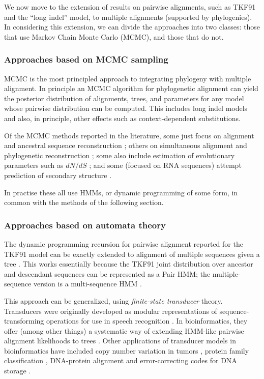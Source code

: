 \documentclass{bmcart}
\begin{document}
We now move to the extension of results on pairwise alignments,
such as TKF91 and the ``long indel'' model, to multiple alignments (supported by phylogenies).
In considering this extension,
we can divide the approaches into two classes:
those that use Markov Chain Monte Carlo (MCMC), and those that do not.

\subsubsection*{Approaches based on MCMC sampling}

MCMC is the most principled approach to integrating phylogeny with multiple alignment.
In principle an MCMC algorithm for phylogenetic alignment can yield the posterior distribution of
alignments, trees, and parameters for any model whose pairwise distribution can be computed.
This includes long indel models and also, in principle, other effects such as context-dependent substitutions.

Of the MCMC methods reported in the literature,
some just focus on alignment and ancestral sequence reconstruction \cite{HolmesBruno2001};
others on simultaneous alignment and phylogenetic reconstruction
\cite{RedelingsSuchard2005,SuchardRedelings2006,RedelingsSuchard2007,NovakEtAl2008,BouchardCoteEtAl2009,WestessonBarquistHolmes2012};
some also include estimation of evolutionary parameters such as $dN/dS$ \cite{Redelings2014};
and some (focused on RNA sequences) attempt prediction of secondary structure \cite{ArunapuramEtAl2013,MeyerMiklos2007}.

In practise these all use HMMs, or dynamic programming of some form,
in common with the methods of the following section.

\subsubsection*{Approaches based on automata theory}

The dynamic programming recursion for pairwise alignment reported for the TKF91 model \cite{ThorneEtal91}
can be exactly extended to alignment of multiple sequences given a tree \cite{Hein2001,LunterSongMiklosHein2003}.
This works essentially because the TKF91 joint distribution over ancestor and descendant sequences
can be represented as a Pair HMM;
the multiple-sequence version is a multi-sequence HMM \cite{HolmesBruno2001}.

This approach can be generalized, using {\em finite-state transducer} theory.
Transducers were originally developed as modular representations of sequence-transforming operations
for use in speech recognition \cite{MohriPereiraRiley2000}.
In bioinformatics, they offer (among other things)
a systematic way of extending HMM-like pairwise alignment likelihoods to trees
\cite{pmid7584457,WestessonEtAl2012,BouchardCote2013,IndelHistorian}.
Other applications of transducer models in bioinformatics have included
copy number variation in tumors \cite{pmid24743184},
protein family classification \cite{pmid12804091},
DNA-protein alignment \cite{pmid15123596}
and error-correcting codes for DNA storage \cite{DBLP:journals/corr/Holmes16}.
\end{document}
